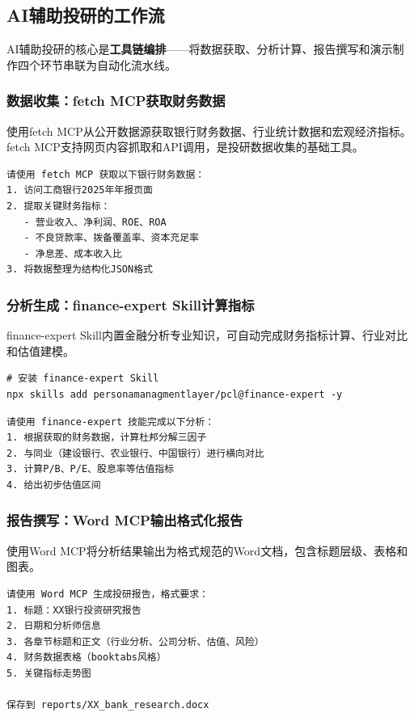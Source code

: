 \subsection{AI辅助投研的工作流}

AI辅助投研的核心是\textbf{工具链编排}——将数据获取、分析计算、报告撰写和演示制作四个环节串联为自动化流水线。

\subsubsection{数据收集：fetch MCP获取财务数据}

使用fetch MCP从公开数据源获取银行财务数据、行业统计数据和宏观经济指标。fetch MCP支持网页内容抓取和API调用，是投研数据收集的基础工具。

\begin{lstlisting}
请使用 fetch MCP 获取以下银行财务数据：
1. 访问工商银行2025年年报页面
2. 提取关键财务指标：
   - 营业收入、净利润、ROE、ROA
   - 不良贷款率、拨备覆盖率、资本充足率
   - 净息差、成本收入比
3. 将数据整理为结构化JSON格式
\end{lstlisting}

\subsubsection{分析生成：finance-expert Skill计算指标}

finance-expert Skill内置金融分析专业知识，可自动完成财务指标计算、行业对比和估值建模。

\begin{lstlisting}[style=shell]
# 安装 finance-expert Skill
npx skills add personamanagmentlayer/pcl@finance-expert -y
\end{lstlisting}

\begin{lstlisting}
请使用 finance-expert 技能完成以下分析：
1. 根据获取的财务数据，计算杜邦分解三因子
2. 与同业（建设银行、农业银行、中国银行）进行横向对比
3. 计算P/B、P/E、股息率等估值指标
4. 给出初步估值区间
\end{lstlisting}

\subsubsection{报告撰写：Word MCP输出格式化报告}

使用Word MCP将分析结果输出为格式规范的Word文档，包含标题层级、表格和图表。

\begin{lstlisting}
请使用 Word MCP 生成投研报告，格式要求：
1. 标题：XX银行投资研究报告
2. 日期和分析师信息
3. 各章节标题和正文（行业分析、公司分析、估值、风险）
4. 财务数据表格（booktabs风格）
5. 关键指标走势图

保存到 reports/XX_bank_research.docx
\end{lstlisting}

